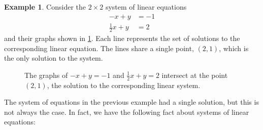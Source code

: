 \documentclass{article}
\theoremstyle{definition}
\newtheorem{example}{Example}
\begin{document}
\begin{example}\label{ex:linear-system-1}
    Consider the \(2 \times 2\) system of linear equations
    \begin{align*}
        -x+y&=-1 \\
        \frac{1}{2}x+y&=2
    \end{align*}
    and their graphs shown in \cref{fig:linear-system-1}. Each line represents the set of solutions to the corresponding linear equation. The lines share a single point, \((2, 1)\), which is the only solution to the system.

\begin{figure}[H]
    \centering
    \caption{The graphs of \(-x+y=-1\) and \(\frac{1}{2}x+y=2\) intersect at the point \((2, 1)\), the solution to the corresponding linear system.}
    \label{fig:linear-system-1}
\end{figure}
\end{example}

The system of equations in the previous example had a single solution, but this is not always the case. In fact, we have the following fact about systems of linear equations:
\end{document}
